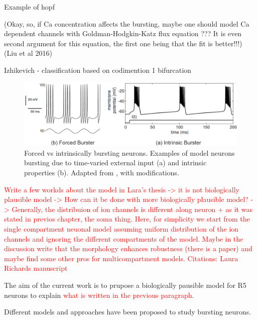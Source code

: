 \documentclass[../main.tex]{subfiles}
\begin{document}
Example of hopf \cite{golombContributionPersistentNa2006}

(Okay, so, if Ca concentration affects the bursting, maybe one should model Ca dependent channels with
Goldman-Hodgkin-Katz flux equation ??? It is even second argument for this equation, the first one being that
the fit is better!!!)
(Liu et al 2016)

Izhikevich - classification based on codimention 1 bifurcation

\color{black}

\begin{figure}[!b]
    \centering
    \includegraphics[width=0.85\linewidth]{../img/modelling_r5/examples/intrinsic_vs_forced_burster.png}
    \caption[Forced vs intrinsically bursting neurons]{
        Forced vs intrinsically bursting neurons. Examples of model neurons bursting due to time-varied external input (a) and intrinsic
        properties (b). Adapted from \cite{izhikevichDynamicalSystemsNeuroscience2006}, with modifications.
    }
    \label{fig:example_forced_intrinsic_bursters}
\end{figure}

\textcolor{red}{Write a few workds about the model in Lara's thesis -> it is not
biologically plausible model -> How can it be done with more biologically plausible model?
-> Generally, the distribuion of ion channels is different along neuron +
as it was stated in previos chapter, the soma thing. Here, for simplicity we start
from the single compartment neuonal model assuming uniform distribution of the
ion channels and ignoring the different compartments of the model.
Maybe in the discussion write that the morphology enhances robustness (there is a paper)
and maybe find some other pros for multicompartment models.
Citations: Laura \cite{krummSlowlyOscillatingBrain2021}
Richards manuscript \cite{raccugliaCoherentMultilevelNetwork2022}
}

The aim of the current work is to prupose a biologically pausible model for R5 neurons
to explain \textcolor{red}{what is written in the previous paragraph}.

Different models and approaches have been proposed to study bursting neurons.
\end{document}
